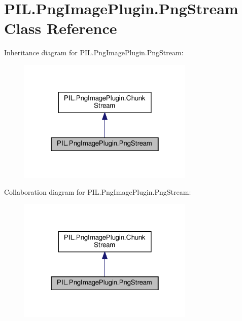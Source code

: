 \hypertarget{classPIL_1_1PngImagePlugin_1_1PngStream}{}\section{P\+I\+L.\+Png\+Image\+Plugin.\+Png\+Stream Class Reference}
\label{classPIL_1_1PngImagePlugin_1_1PngStream}


Inheritance diagram for P\+I\+L.\+Png\+Image\+Plugin.\+Png\+Stream\+:
\nopagebreak
\begin{figure}[H]
\begin{center}
\leavevmode
\includegraphics[width=238pt]{classPIL_1_1PngImagePlugin_1_1PngStream__inherit__graph}
\end{center}
\end{figure}


Collaboration diagram for P\+I\+L.\+Png\+Image\+Plugin.\+Png\+Stream\+:
\nopagebreak
\begin{figure}[H]
\begin{center}
\leavevmode
\includegraphics[width=238pt]{classPIL_1_1PngImagePlugin_1_1PngStream__coll__graph}
\end{center}
\end{figure}
